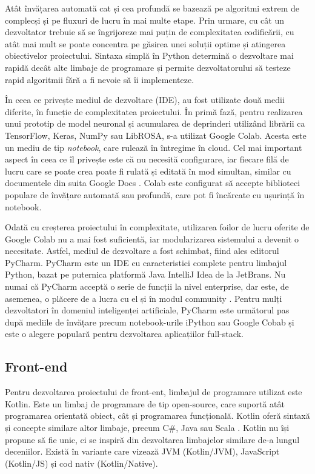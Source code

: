 \documentclass[a4paper,12pt]{report}
\begin{document}
Atât învățarea automată cat și cea profundă se bazează pe 
algoritmi extrem de complecși și pe fluxuri de lucru
în mai multe etape. Prin urmare, cu cât un dezvoltator 
trebuie să se îngrijoreze mai puțin de complexitatea 
codificării, cu atât mai mult se poate concentra pe găsirea unei soluții
optime și atingerea obiectivelor proiectului. 
Sintaxa simplă în Python determină o dezvoltare mai rapidă 
decât alte limbaje de programare și permite dezvoltatorului să 
testeze rapid algoritmii fără a fi nevoie să îi implementeze.

În ceea ce privește mediul de dezvoltare (IDE), au fost utilizate 
două medii diferite, în funcție de complexitatea proiectului. 
În primă fază, pentru realizarea 
unui prototip de model neuronal și acumularea de deprinderi utilizând 
librării ca TensorFlow, Keras, NumPy sau LibROSA, s-a utilizat
Google Colab. Acesta este un mediu de tip \emph{notebook},
care rulează în întregime în cloud. Cel mai important aspect
în ceea ce îl privește este că nu necesită configurare, iar 
fiecare filă de lucru care se poate crea poate fi rulată și 
editată în mod simultan, similar cu documentele din suita 
Google Docs \cite{WEBSITE:google-colab}. Colab este configurat să accepte
biblioteci populare de învățare automată sau profundă, care pot fi
încărcate cu ușurință în notebook.

Odată cu creșterea proiectului în complexitate, utilizarea 
foilor de lucru oferite de Google Colab nu a mai fost suficientă,
iar modularizarea sistemului a devenit o necesitate. Astfel, 
mediul de dezvoltare a fost schimbat, fiind ales editorul PyCharm.
PyCharm este un IDE cu caracteristici complete pentru limbajul Python,
bazat pe puternica platformă Java IntelliJ Idea de la JetBrans. 
Nu numai că PyCharm acceptă o serie de funcții la nivel enterprise, 
dar este, de asemenea, o plăcere de a lucra cu el și în 
modul community \cite{WEBSITE:pycharm}. Pentru mulți dezvoltatori în domeniul inteligenței 
artificiale, PyCharm este următorul pas după mediile de învățare precum notebook-urile iPython
sau Google Cobab și este o alegere populară pentru dezvoltarea 
aplicațiilor full-stack.
\subsection{Front-end}
Pentru dezvoltarea proiectului de front-ent, limbajul de programare 
utilizat este Kotlin. Este un limbaj de programare de tip 
open-source, care suportă atât programarea orientată obiect, cât și 
programarea funcțională. Kotlin oferă sintaxă și concepte similare 
altor limbaje, precum C\#, Java sau Scala \cite{WEBSITE:kotlin-overview}.
Kotlin nu își propune să fie unic, ci se inspiră din dezvoltarea
limbajelor similare de-a lungul deceniilor. Există în variante care vizează JVM (Kotlin/JVM),
JavaScript (Kotlin/JS) și cod nativ (Kotlin/Native).
\end{document}
